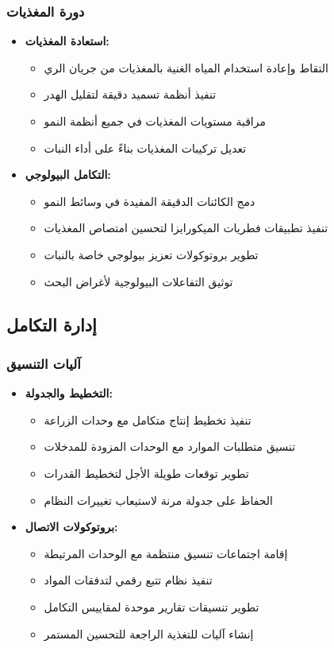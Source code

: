 \subsubsection{دورة المغذيات}
\begin{itemize}
    \item \textbf{استعادة المغذيات:}
    \begin{itemize}
        \item التقاط وإعادة استخدام المياه الغنية بالمغذيات من جريان الري
        \item تنفيذ أنظمة تسميد دقيقة لتقليل الهدر
        \item مراقبة مستويات المغذيات في جميع أنظمة النمو
        \item تعديل تركيبات المغذيات بناءً على أداء النبات
    \end{itemize}
    
    \item \textbf{التكامل البيولوجي:}
    \begin{itemize}
        \item دمج الكائنات الدقيقة المفيدة في وسائط النمو
        \item تنفيذ تطبيقات فطريات الميكورايزا لتحسين امتصاص المغذيات
        \item تطوير بروتوكولات تعزيز بيولوجي خاصة بالنبات
        \item توثيق التفاعلات البيولوجية لأغراض البحث
    \end{itemize}
\end{itemize}

\subsection{إدارة التكامل}

\subsubsection{آليات التنسيق}
\begin{itemize}
    \item \textbf{التخطيط والجدولة:}
    \begin{itemize}
        \item تنفيذ تخطيط إنتاج متكامل مع وحدات الزراعة
        \item تنسيق متطلبات الموارد مع الوحدات المزودة للمدخلات
        \item تطوير توقعات طويلة الأجل لتخطيط القدرات
        \item الحفاظ على جدولة مرنة لاستيعاب تغييرات النظام
    \end{itemize}
    
    \item \textbf{بروتوكولات الاتصال:}
    \begin{itemize}
        \item إقامة اجتماعات تنسيق منتظمة مع الوحدات المرتبطة
        \item تنفيذ نظام تتبع رقمي لتدفقات المواد
        \item تطوير تنسيقات تقارير موحدة لمقاييس التكامل
        \item إنشاء آليات للتغذية الراجعة للتحسين المستمر
    \end{itemize}
\end{itemize}

